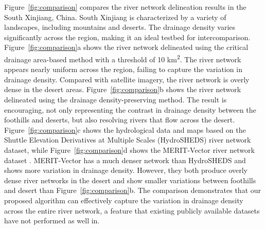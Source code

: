 \documentclass[water,article,submit,pdftex,moreauthors]{Definitions/mdpi}
\begin{document}
Figure~\ref{fig:comparison} compares the river network delineation results in the South Xinjiang, China. South Xinjiang is characterized by a variety of landscapes, including mountains and deserts. The drainage density varies significantly across the region, making it an ideal testbed for intercomparison. Figure~\ref{fig:comparison}a shows the river network delineated using the critical drainage area-based method with a threshold of 10 km\textsuperscript{2}. The river network appears nearly uniform across the region, failing to capture the variation in drainage density. Compared with satellite imagery, the river network is overly dense in the desert areas. Figure~\ref{fig:comparison}b shows the river network delineated using the drainage density-preserving method. The result is encouraging, not only representing the contrast in drainage density between the foothills and deserts, but also resolving rivers that flow across the desert. Figure~\ref{fig:comparison}c shows the hydrological data and maps based on the Shuttle Elevation Derivatives at Multiple Scales (HydroSHEDS) river network dataset, while Figure~\ref{fig:comparison}d shows the MERIT-Vector river network dataset \citep{lin2021SD}. MERIT-Vector has a much denser network than HydroSHEDS and shows more variation in drainage density. However, they both produce overly dense river networks in the desert and show smaller variations between foothills and desert than Figure~\ref{fig:comparison}b. The comparison demonstrates that our proposed algorithm can effectively capture the variation in drainage density across the entire river network, a feature that existing publicly available datasets have not performed as well in.
\end{document}

